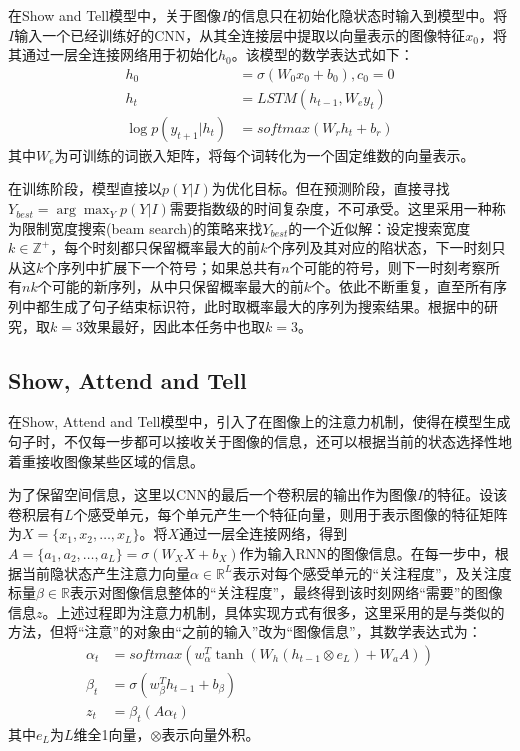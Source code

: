 \documentclass[10pt,a4paper,UTF8]{ctexart}
\begin{document}
\begin{spacing}{1.5}
		在Show and Tell模型中，关于图像$I$的信息只在初始化隐状态时输入到模型中。将$I$输入一个已经训练好的CNN，从其全连接层中提取以向量表示的图像特征$x_0$，将其通过一层全连接网络用于初始化$h_0$。该模型的数学表达式如下：
		\begin{align}
		h_0&=\sigma(W_0x_0+b_0), c_0=0\\
		h_t&=LSTM(h_{t-1},W_ey_t) \\
		\log p(y_{t+1}|h_t)&=softmax(W_rh_t+b_r)
		\end{align}
		其中$W_e$为可训练的词嵌入矩阵，将每个词转化为一个固定维数的向量表示。
		
		在训练阶段，模型直接以$p(Y|I)$为优化目标。但在预测阶段，直接寻找$Y_{best}=\arg\max_Yp(Y|I)$需要指数级的时间复杂度，不可承受。这里采用一种称为限制宽度搜索(beam search)的策略来找$Y_{best}$的一个近似解：设定搜索宽度$k\in\mathbb{Z^+}$，每个时刻都只保留概率最大的前$k$个序列及其对应的陷状态，下一时刻只从这$k$个序列中扩展下一个符号；如果总共有$n$个可能的符号，则下一时刻考察所有$nk$个可能的新序列，从中只保留概率最大的前$k$个。依此不断重复，直至所有序列中都生成了句子结束标识符，此时取概率最大的序列为搜索结果。根据\cite{st}中的研究，取$k=3$效果最好，因此本任务中也取$k=3$。
		
		\subsection{Show, Attend and Tell}
		
		在Show, Attend and Tell模型中，引入了在图像上的注意力机制，使得在模型生成句子时，不仅每一步都可以接收关于图像的信息，还可以根据当前的状态选择性地着重接收图像某些区域的信息。
		
		为了保留空间信息，这里以CNN的最后一个卷积层的输出作为图像$I$的特征。设该卷积层有$L$个感受单元，每个单元产生一个特征向量，则用于表示图像的特征矩阵为$X=\{x_1,x_2,\dots,x_L\}$。将$X$通过一层全连接网络，得到$A=\{a_1,a_2,\dots,a_L\}=\sigma(W_XX+b_X)$作为输入RNN的图像信息。在每一步中，根据当前隐状态产生注意力向量$\alpha\in\mathbb{R}^L$表示对每个感受单元的“关注程度”，及关注度标量$\beta\in\mathbb{R}$表示对图像信息整体的“关注程度”，最终得到该时刻网络“需要”的图像信息$z$。上述过程即为注意力机制，具体实现方式有很多，这里采用的是与\cite{att}类似的方法，但将“注意”的对象由“之前的输入”改为“图像信息”，其数学表达式为：
		\begin{align}
		\alpha_t&=softmax(w_\alpha^T\tanh(W_h(h_{t-1}\otimes e_L)+W_aA))\\
		\beta_t&=\sigma(w_\beta^Th_{t-1}+b_\beta)\\
		z_t&=\beta_t(A\alpha_t)
		\end{align}
		其中$e_L$为$L$维全1向量，$\otimes$表示向量外积。
		

\end{spacing}
\end{document}
